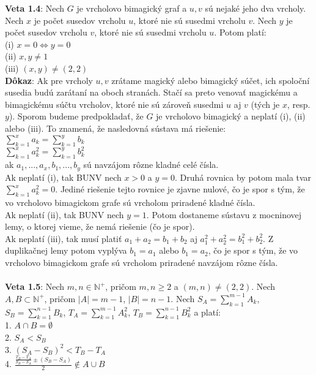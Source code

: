 \documentclass[12pt]{article}
\begin{document}
\textbf{Veta 1.4}: Nech $G$ je vrcholovo bimagický graf a $u,v$ sú nejaké jeho dva vrcholy. Nech $x$ je počet susedov vrcholu $u$, ktoré nie sú susedmi vrcholu $v$. Nech $y$ je počet susedov vrcholu $v$, ktoré nie sú susedmi vrcholu $u$. Potom platí: \\
(i) $x = 0 \iff y = 0$ \\
(ii) $x,y \neq 1$ \\
(iii) $(x,y) \neq (2,2)$ \\

\textbf{Dôkaz}: Ak pre vrcholy $u,v$ zrátame magický alebo bimagický súčet, ich spoloční susedia budú zarátaní na oboch stranách. Stačí sa preto venovať magickému a bimagickému súčtu vrcholov, ktoré nie sú zároveň susedmi $u$ aj $v$ (tých je $x$, resp. $y$). Sporom budeme predpokladať, že $G$ je vrcholovo bimagický a neplatí (i), (ii) alebo (iii). To znamená, že nasledovná sústava má riešenie: \\
$\sum_{k=1}^{x} a_k = \sum_{k=1}^{y} b_k$ \\
$\sum_{k=1}^{x} a^2_k = \sum_{k=1}^{y} b^2_k$ \\
ak $a_1, ... , a_x, b_1, ... , b_y$ sú navzájom rôzne kladné celé čísla. \\

Ak neplatí (i), tak BUNV nech $x > 0$ a $y = 0$. Druhá rovnica by potom mala tvar $\sum_{k=1}^{x} a^2_k = 0$. Jediné riešenie tejto rovnice je zjavne nulové, čo je spor s tým, že vo vrcholovo bimagickom grafe sú vrcholom priradené kladné čísla.  \\

Ak neplatí (ii), tak BUNV nech $y = 1$. Potom dostaneme sústavu z mocninovej lemy, o ktorej vieme, že nemá riešenie (čo je spor). \\

Ak neplatí (iii), tak musí platiť $a_1 + a_2 = b_1 + b_2$ aj $a^2_1 + a^2_2 = b^2_1 + b^2_2$. Z duplikačnej lemy potom vyplýva $b_1 = a_1$ alebo $b_1 = a_2$,  čo je spor s tým, že vo vrcholovo bimagickom grafe sú vrcholom priradené navzájom rôzne čísla. \\\\

\textbf{Veta 1.5}: Nech $m,n \in \mathbb{N^+}$, pričom $m,n \geq 2$ a $(m, n) \neq (2, 2)$. Nech $A,B \subset \mathbb{N^+}$, pričom $|A| = m - 1$, $|B| = n - 1$. Nech $S_A = \sum_{k=1}^{m-1} A_k$, $S_B = \sum_{k=1}^{n-1} B_k$, $T_A = \sum_{k=1}^{m-1} A^2_k$,  $T_B = \sum_{k=1}^{n-1} B^2_k$ a platí: \\
1. $A \cap B = \emptyset$ \\
2. $S_A < S_B$ \\
3. $(S_A - S_B)^2 < T_B - T_A$ \\
4. $\frac{\frac{T_B - T_A}{S_B - S_A} \pm (S_B - S_A)}{2} \notin A \cup B$ \\
\end{document}
